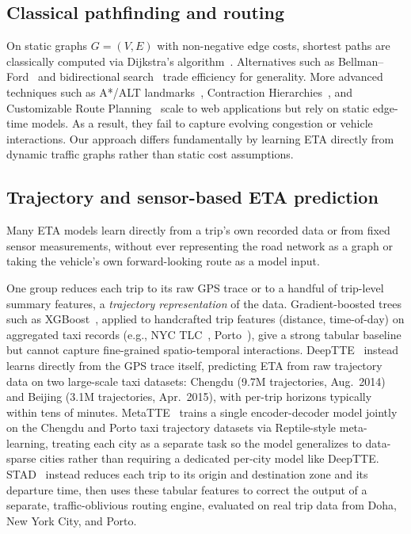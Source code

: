 \documentclass[pdflatex,sn-basic,Numbered]{sn-jnl}%
\begin{document}
\subsection{Classical pathfinding and routing}
On static graphs $G=(V,E)$ with non-negative edge costs, shortest paths are classically computed via Dijkstra's algorithm~\cite{dijkstra1959}. Alternatives such as Bellman--Ford~\cite{bellman1958routing} and bidirectional search~\cite{pohl1971bi} trade efficiency for generality. More advanced techniques such as A*/ALT landmarks~\cite{goldberg2005}, Contraction Hierarchies~\cite{geisberger2008}, and Customizable Route Planning~\cite{delling2011} scale to web applications but rely on static edge-time models. As a result, they fail to capture evolving congestion or vehicle interactions. Our approach differs fundamentally by learning ETA directly from dynamic traffic graphs rather than static cost assumptions.

\subsection{Trajectory and sensor-based ETA prediction}\label{sec:rw-no-graph}
Many ETA models learn directly from a trip's own recorded data or from fixed sensor measurements, without ever representing the road network as a graph or taking the vehicle's own forward-looking route as a model input.

One group reduces each trip to its raw GPS trace or to a handful of trip-level summary features, a \emph{trajectory representation} of the data. Gradient-boosted trees such as XGBoost~\cite{chen2016xgboost}, applied to handcrafted trip features (distance, time-of-day) on aggregated taxi records (e.g., NYC TLC~\cite{nyc_tlc}, Porto~\cite{moreira2013porto}), give a strong tabular baseline but cannot capture fine-grained spatio-temporal interactions. DeepTTE~\cite{deepTTE2018} instead learns directly from the GPS trace itself, predicting ETA from raw trajectory data on two large-scale taxi datasets: Chengdu (9.7M trajectories, Aug.\ 2014) and Beijing (3.1M trajectories, Apr.\ 2015), with per-trip horizons typically within tens of minutes. MetaTTE~\cite{wang2022metatte} trains a single encoder-decoder model jointly on the Chengdu and Porto taxi trajectory datasets via Reptile-style meta-learning, treating each city as a separate task so the model generalizes to data-sparse cities rather than requiring a dedicated per-city model like DeepTTE. STAD~\cite{abbar2020stad} instead reduces each trip to its origin and destination zone and its departure time, then uses these tabular features to correct the output of a separate, traffic-oblivious routing engine, evaluated on real trip data from Doha, New York City, and Porto.
\end{document}
